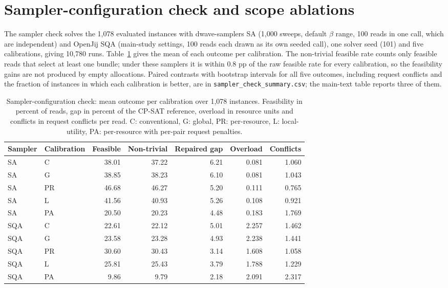 \documentclass[pdflatex,sn-nature]{sn-jnl}
\begin{document}
\section{Sampler-configuration check and scope ablations}\label{sec:samplercheck}
The sampler check solves the 1,078 evaluated instances with dwave-samplers SA (1,000 sweeps, default $\beta$ range, 100 reads in one call, which are independent) and OpenJij SQA (main-study settings, 100 reads each drawn as its own seeded call), one solver seed (101) and five calibrations, giving 10,780 runs. Table~\ref{tab:samplerlevels} gives the mean of each outcome per calibration. The non-trivial feasible rate counts only feasible reads that select at least one bundle; under these samplers it is within 0.8 pp of the raw feasible rate for every calibration, so the feasibility gains are not produced by empty allocations. Paired contrasts with bootstrap intervals for all five outcomes, including request conflicts and the fraction of instances in which each calibration is better, are in \texttt{sampler\_check\_summary.csv}; the main-text table reports three of them.

\begin{table}[h]
\caption{Sampler-configuration check: mean outcome per calibration over 1,078 instances. Feasibility in percent of reads, gap in percent of the CP-SAT reference, overload in resource units and conflicts in request conflicts per read. C: conventional, G: global, PR: per-resource, L: local-utility, PA: per-resource with per-pair request penalties.}\label{tab:samplerlevels}\centering\small
\begin{tabular}{@{}llrrrrr@{}}
\toprule
Sampler & Calibration & Feasible & Non-trivial & Repaired gap & Overload & Conflicts\\
\midrule
SA & C & 38.01 & 37.22 & 6.21 & 0.081 & 1.060\\
SA & G & 38.85 & 38.23 & 6.10 & 0.081 & 1.043\\
SA & PR & 46.68 & 46.27 & 5.20 & 0.111 & 0.765\\
SA & L & 41.56 & 40.93 & 5.26 & 0.108 & 0.921\\
SA & PA & 20.50 & 20.23 & 4.48 & 0.183 & 1.769\\
SQA & C & 22.61 & 22.12 & 5.01 & 2.257 & 1.462\\
SQA & G & 23.58 & 23.28 & 4.93 & 2.238 & 1.441\\
SQA & PR & 30.60 & 30.43 & 3.14 & 1.608 & 1.058\\
SQA & L & 25.81 & 25.43 & 3.79 & 1.788 & 1.229\\
SQA & PA & 9.86 & 9.79 & 2.18 & 2.091 & 2.317\\
\bottomrule
\end{tabular}
\end{table}
\end{document}
